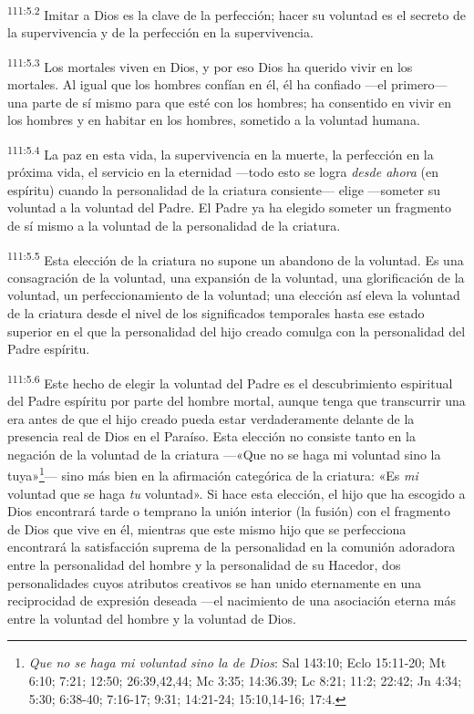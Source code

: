 \par
\textsuperscript{111:5.2} Imitar a Dios es la clave de la perfección; hacer su voluntad es el secreto de la supervivencia y de la perfección en la supervivencia.

\par
\textsuperscript{111:5.3} Los mortales viven en Dios, y por eso Dios ha querido vivir en los mortales. Al igual que los hombres confían en él, él ha confiado ---el primero--- una parte de sí mismo para que esté con los hombres; ha consentido en vivir en los hombres y en habitar en los hombres, sometido a la voluntad humana.

\par
\textsuperscript{111:5.4} La paz en esta vida, la supervivencia en la muerte, la perfección en la próxima vida, el servicio en la eternidad ---todo esto se logra \textit{desde ahora} (en espíritu) cuando la personalidad de la criatura consiente--- elige ---someter su voluntad a la voluntad del Padre. El Padre ya ha elegido someter un fragmento de sí mismo a la voluntad de la personalidad de la criatura.

\par
\textsuperscript{111:5.5} Esta elección de la criatura no supone un abandono de la voluntad. Es una consagración de la voluntad, una expansión de la voluntad, una glorificación de la voluntad, un perfeccionamiento de la voluntad; una elección así eleva la voluntad de la criatura desde el nivel de los significados temporales hasta ese estado superior en el que la personalidad del hijo creado comulga con la personalidad del Padre espíritu.

\par
\textsuperscript{111:5.6} Este hecho de elegir la voluntad del Padre es el descubrimiento espiritual del Padre espíritu por parte del hombre mortal, aunque tenga que transcurrir una era antes de que el hijo creado pueda estar verdaderamente delante de la presencia real de Dios en el Paraíso. Esta elección no consiste tanto en la negación de la voluntad de la criatura ---«Que no se haga mi voluntad sino la tuya»\footnote{\textit{Que no se haga mi voluntad sino la de Dios}: Sal 143:10; Eclo 15:11-20; Mt 6:10; 7:21; 12:50; 26:39,42,44; Mc 3:35; 14:36.39; Lc 8:21; 11:2; 22:42; Jn 4:34; 5:30; 6:38-40; 7:16-17; 9:31; 14:21-24; 15:10,14-16; 17:4.}--- sino más bien en la afirmación categórica de la criatura: «Es \textit{mi} voluntad que se haga \textit{tu} voluntad». Si hace esta elección, el hijo que ha escogido a Dios encontrará tarde o temprano la unión interior (la fusión) con el fragmento de Dios que vive en él, mientras que este mismo hijo que se perfecciona encontrará la satisfacción suprema de la personalidad en la comunión adoradora entre la personalidad del hombre y la personalidad de su Hacedor, dos personalidades cuyos atributos creativos se han unido eternamente en una reciprocidad de expresión deseada ---el nacimiento de una asociación eterna más entre la voluntad del hombre y la voluntad de Dios.

